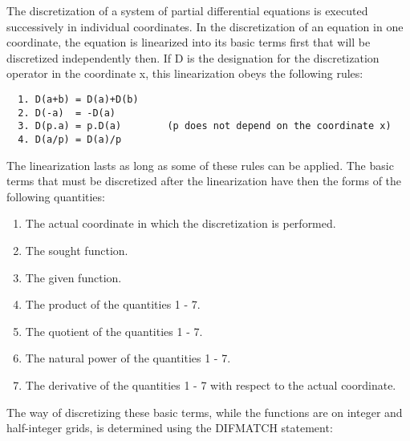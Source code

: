      The discretization of a system of partial differential equations is
executed successively in individual  coordinates. In  the discretization
of an  equation in  one coordinate,  the equation is linearized into its
basic terms first that will be discretized independently then.   If D is
the  designation  for  the  discretization operator in the coordinate x,
this linearization obeys the following rules:
\begin{verbatim}
  1. D(a+b) = D(a)+D(b)
  2. D(-a)  = -D(a)
  3. D(p.a) = p.D(a)        (p does not depend on the coordinate x)
  4. D(a/p) = D(a)/p
\end{verbatim}
     The linearization lasts as long  as  some  of  these  rules  can be
applied.   The   basic   terms   that  must  be  discretized  after  the
linearization have then the forms of the following quantities:
\begin{enumerate}
  \item The actual coordinate in which the discretization is performed.
   \item The sought function.
   \item The given function.
   \item The product of the quantities 1 - 7.
   \item The quotient of the quantities 1 - 7.
   \item The natural power of the quantities 1 - 7.
   \item The derivative of the quantities 1 - 7 with respect to the
     actual coordinate.
\end{enumerate}
The way of discretizing these basic  terms, while  the functions  are on
integer  and  half-integer  grids,  is  determined  using  the  DIFMATCH
statement:
